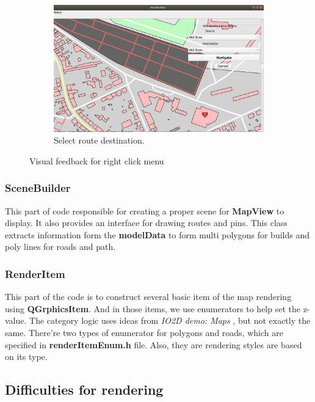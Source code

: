 \documentclass[a4paper, 12pt, english]{book}
\begin{document}
\begin{enumerate}
\begin{figure}[h!]
\begin{subfigure}[b]{0.4\linewidth}
			\includegraphics[width=\linewidth]{./img/selDest.png}
			\caption{Select route destination.}
		\end{subfigure}
		\caption{Visual feedback for right click menu}
		\label{fig:rightClickMenu}
	\end{figure}
	
\end{enumerate}
\subsubsection{SceneBuilder}

This part of code responsible for creating a proper scene for {\textbf{MapView}} to display. It also provides an interface for drawing routes and pins. This class extracts information form the {\textbf{modelData}} to form multi polygons for builds and poly lines for roads and path. 

\subsubsection{RenderItem}

This part of the code is to construct several basic item of the map rendering using {\textbf{QGrphicsItem}}. And in those items, we use enumerators to help set the z-value. The category logic uses ideas from {\textit{IO2D demo: Maps}} {\cite{IO2D}}, but not exactly the same. There're two types of enumerator for polygons and roads, which are specified in {\textbf{renderItemEnum.h}} file. Also, they are rendering styles are based on its type.

\subsection{Difficulties for rendering}
\end{document}
